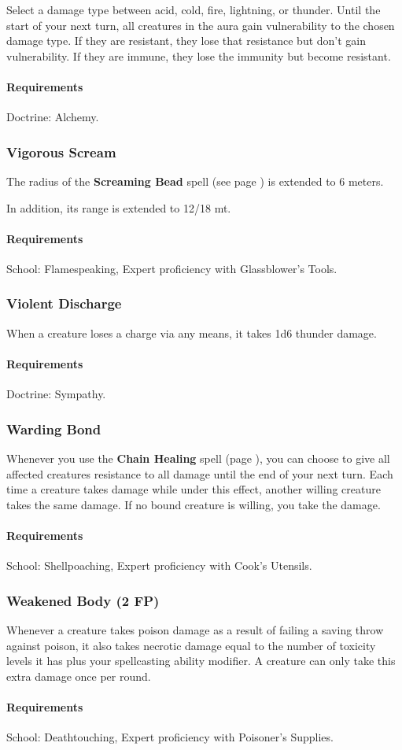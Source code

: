     Select a damage type between acid, cold, fire, lightning, or thunder.
    Until the start of your next turn, all creatures in the aura gain vulnerability to the chosen damage type.
    If they are resistant, they lose that resistance but don't gain vulnerability.
    If they are immune, they lose the immunity but become resistant.
    \paragraph{Requirements} Doctrine: Alchemy.
\subsubsection{Vigorous Scream} \label{feat::vigorousscream}
    The radius of the \textbf{Screaming Bead} spell (see page \pageref{spell::screamingbead}) is extended to 6 meters.

    In addition, its range is extended to 12/18 mt.
    \paragraph{Requirements} School: Flamespeaking, Expert proficiency with Glassblower's Tools.
\subsubsection{Violent Discharge} \label{feat::violentdischarge}
    When a creature loses a charge via any means, it takes 1d6 thunder damage.
    \paragraph{Requirements} Doctrine: Sympathy.
\subsubsection{Warding Bond} \label{feat::wardingbond}
    Whenever you use the \textbf{Chain Healing} spell (page \pageref{spell::chainhealing}), you can choose to give all affected creatures resistance to all damage until the end of your next turn.
    Each time a creature takes damage while under this effect, another willing creature takes the same damage.
    If no bound creature is willing, you take the damage.
    \paragraph{Requirements} School: Shellpoaching, Expert proficiency with Cook's Utensils.
\subsubsection{Weakened Body (2 FP)} \label{feat::weakenedbody}
    Whenever a creature takes poison damage as a result of failing a saving throw against poison, it also takes necrotic damage equal to the number of toxicity levels it has plus your spellcasting ability modifier.
    A creature can only take this extra damage once per round.
    \paragraph{Requirements} School: Deathtouching, Expert proficiency with Poisoner's Supplies.

\newpage~\newpage
